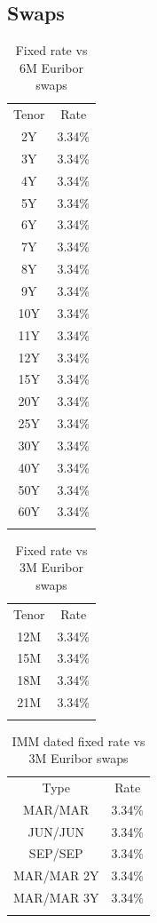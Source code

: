\documentclass[11pt,reqno]{amsart}
\begin{document}
\subsection{\label{SecSwap}Swaps}
\begin{table}[tbp]
\label{tab:swaps6M}
\begin{tabular}{cc}
Tenor & Rate \\
2Y  & 3.34\% \\
3Y  & 3.34\% \\
4Y  & 3.34\% \\
5Y  & 3.34\% \\
6Y  & 3.34\% \\
7Y  & 3.34\% \\
8Y  & 3.34\% \\
9Y  & 3.34\% \\
10Y & 3.34\% \\
11Y & 3.34\% \\
12Y & 3.34\% \\
15Y & 3.34\% \\
20Y & 3.34\% \\
25Y & 3.34\% \\
30Y & 3.34\% \\
40Y & 3.34\% \\
50Y & 3.34\% \\
60Y & 3.34\% \\
&
\end{tabular}%
\caption{Fixed rate vs 6M Euribor swaps}
\end{table}

\begin{table}[tbp]
\label{tab:swaps3M}
\begin{tabular}{cc}
Tenor & Rate \\
12M & 3.34\% \\
15M & 3.34\% \\
18M & 3.34\% \\
21M & 3.34\% \\
&
\end{tabular}%
\caption{Fixed rate vs 3M Euribor swaps}
\end{table}

\begin{table}[tbp]
\label{tab:swapsIMM}
\begin{tabular}{cc}
Type & Rate \\
MAR/MAR & 3.34\% \\
JUN/JUN & 3.34\% \\
SEP/SEP & 3.34\% \\
MAR/MAR 2Y & 3.34\% \\
MAR/MAR 3Y & 3.34\% \\
&
\end{tabular}%
\caption{IMM dated fixed rate vs 3M Euribor swaps}
\end{table}
\end{document}
